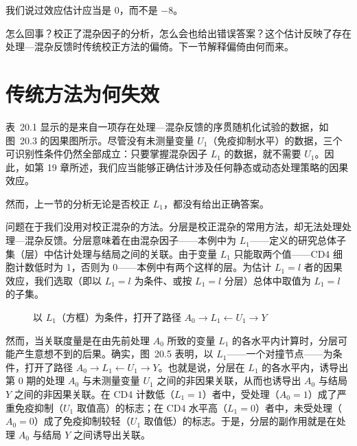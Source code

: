 我们说过效应估计应当是 0，而不是 $-8$。

怎么回事？校正了混杂因子的分析，怎么会也给出错误答案？这个估计反映了存在处理—混杂反馈时传统校正方法的偏倚。下一节解释偏倚由何而来。

\section{传统方法为何失效}

表~20.1 显示的是来自一项存在处理—混杂反馈的序贯随机化试验的数据，如图~20.3 的因果图所示。尽管没有未测量变量 $U_1$（免疫抑制水平）的数据，三个可识别性条件仍然全部成立：只要掌握混杂因子 $L_1$ 的数据，就不需要 $U_1$。因此，如第 19 章所述，我们应当能够正确估计涉及任何静态或动态处理策略的因果效应。

然而，上一节的分析无论是否校正 $L_1$，都没有给出正确答案。

问题在于我们没用对校正混杂的方法。分层是校正混杂的常用方法，却无法处理处理—混杂反馈。分层意味着在由混杂因子——本例中为 $L_1$——定义的研究总体子集（层）中估计处理与结局之间的关联。由于变量 $L_1$ 只能取两个值——CD4 细胞计数低时为 1，否则为 0——本例中有两个这样的层。为估计 $L_1=l$ 者的因果效应，我们选取（即以 $L_1=l$ 为条件、或按 $L_1=l$ 分层）总体中取值为 $L_1=l$ 的子集。

\begin{figure}[htbp]
\centering
{}
\caption{以 $L_1$（方框）为条件，打开了路径 $A_0\to L_1\leftarrow U_1\to Y$}
\label{fig:20.5}
\end{figure}

然而，当关联度量是在由先前处理 $A_0$ 所致的变量 $L_1$ 的各水平内计算时，分层可能产生意想不到的后果。确实，图~20.5 表明，以 $L_1$——一个对撞节点——为条件，打开了路径 $A_0\to L_1\leftarrow U_1\to Y$。也就是说，分层在 $L_1$ 的各水平内，诱导出第 0 期的处理 $A_0$ 与未测量变量 $U_1$ 之间的非因果关联，从而也诱导出 $A_0$ 与结局 $Y$ 之间的非因果关联。在 CD4 计数低（$L_1=1$）者中，受处理（$A_0=1$）成了严重免疫抑制（$U_1$ 取值高）的标志；在 CD4 水平高（$L_1=0$）者中，未受处理（$A_0=0$）成了免疫抑制较轻（$U_1$ 取值低）的标志。于是，分层的副作用就是在处理 $A_0$ 与结局 $Y$ 之间诱导出关联。

